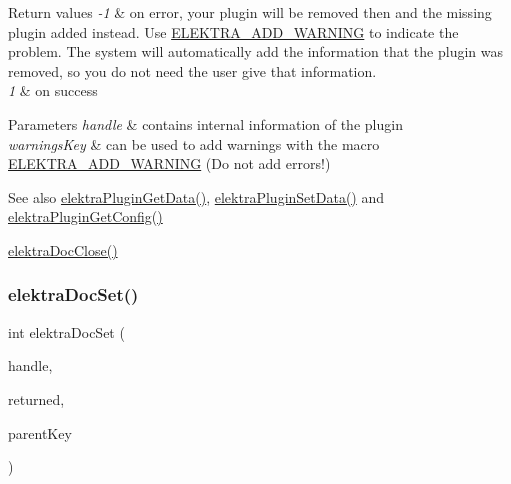 \begin{DoxyRetVals}{Return values}
{\em -\/1} & on error, your plugin will be removed then and the missing plugin added instead. Use \mbox{\hyperlink{group__plugin_ga3da3bdb0f41710adda9eee3d7adac9ff}{E\+L\+E\+K\+T\+R\+A\+\_\+\+A\+D\+D\+\_\+\+W\+A\+R\+N\+I\+NG}} to indicate the problem. The system will automatically add the information that the plugin was removed, so you do not need the user give that information.\\
\hline
{\em 1} & on success\\
\hline
\end{DoxyRetVals}

\begin{DoxyParams}{Parameters}
{\em handle} & contains internal information of the plugin \\
\hline
{\em warnings\+Key} & can be used to add warnings with the macro \mbox{\hyperlink{group__plugin_ga3da3bdb0f41710adda9eee3d7adac9ff}{E\+L\+E\+K\+T\+R\+A\+\_\+\+A\+D\+D\+\_\+\+W\+A\+R\+N\+I\+NG}} (Do not add errors!) \\
\hline
\end{DoxyParams}
\begin{DoxySeeAlso}{See also}
\mbox{\hyperlink{group__plugin_gaafcf3216b46292f222b8cc7828b4dd20}{elektra\+Plugin\+Get\+Data()}}, \mbox{\hyperlink{group__plugin_gaf4b941a52ff55d0ca2a9158d90208ef2}{elektra\+Plugin\+Set\+Data()}} and \mbox{\hyperlink{group__plugin_ga644bead796506c172817724051c977c9}{elektra\+Plugin\+Get\+Config()}} 

\mbox{\hyperlink{group__plugin_ga1236aefe5b2baf8b7bf636ba5aa9ea29}{elektra\+Doc\+Close()}} 
\end{DoxySeeAlso}
\mbox{\label{group__plugin_gae65781a1deb34efc79c8cb9d9174842c}} 
\subsubsection{\texorpdfstring{elektraDocSet()}{elektraDocSet()}}
{\footnotesize\ttfamily int elektra\+Doc\+Set (\begin{DoxyParamCaption}\item[{Plugin $\ast$}]{handle,  }\item[{Key\+Set $\ast$}]{returned,  }\item[{Key $\ast$}]{parent\+Key }\end{DoxyParamCaption})}



